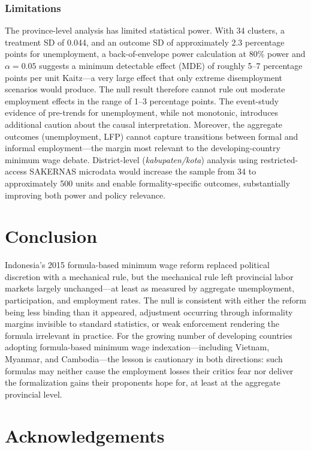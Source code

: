 \documentclass[12pt]{article}
\begin{document}
\subsubsection*{Limitations} The province-level analysis has limited statistical power. With 34 clusters, a treatment SD of 0.044, and an outcome SD of approximately 2.3 percentage points for unemployment, a back-of-envelope power calculation at 80\% power and $\alpha = 0.05$ suggests a minimum detectable effect (MDE) of roughly 5--7 percentage points per unit Kaitz---a very large effect that only extreme disemployment scenarios would produce. The null result therefore cannot rule out moderate employment effects in the range of 1--3 percentage points. The event-study evidence of pre-trends for unemployment, while not monotonic, introduces additional caution about the causal interpretation. Moreover, the aggregate outcomes (unemployment, LFP) cannot capture transitions between formal and informal employment---the margin most relevant to the developing-country minimum wage debate. District-level (\textit{kabupaten/kota}) analysis using restricted-access SAKERNAS microdata would increase the sample from 34 to approximately 500 units and enable formality-specific outcomes, substantially improving both power and policy relevance.

\section{Conclusion}

Indonesia's 2015 formula-based minimum wage reform replaced political discretion with a mechanical rule, but the mechanical rule left provincial labor markets largely unchanged---at least as measured by aggregate unemployment, participation, and employment rates. The null is consistent with either the reform being less binding than it appeared, adjustment occurring through informality margins invisible to standard statistics, or weak enforcement rendering the formula irrelevant in practice. For the growing number of developing countries adopting formula-based minimum wage indexation---including Vietnam, Myanmar, and Cambodia---the lesson is cautionary in both directions: such formulas may neither cause the employment losses their critics fear nor deliver the formalization gains their proponents hope for, at least at the aggregate provincial level.

\section*{Acknowledgements}
\end{document}
